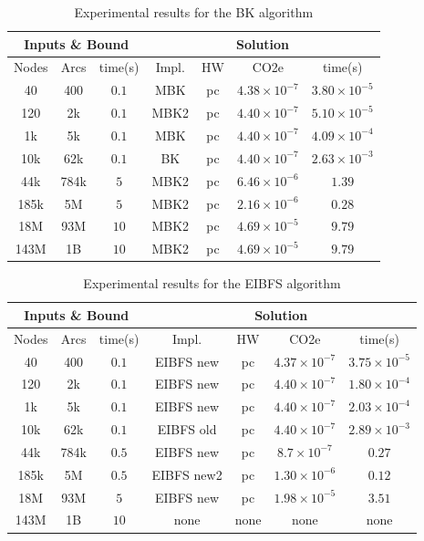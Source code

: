 \documentclass[a4paper,singleside,12pt]{report} %
\begin{document}
\begin{table}[h!]
    \centering
    \begin{tabular}{|ccc|cccc|}
        \hline
        \multicolumn{3}{|c|}{Inputs \& Bound} & \multicolumn{4}{c|}{Solution} \\
        \hline
        Nodes & Arcs & time(s) & Impl. & HW & CO2e & time(s) \\
        \hline
        40 & 400 & $0.1$ & MBK & pc & $4.38 \times 10^{-7}$ & $3.80 \times 10^{-5}$ \\
        120 & 2k & $0.1$ & MBK2 & pc & $4.40 \times 10^{-7}$ & $5.10 \times 10^{-5}$ \\
        1k & 5k & $0.1$ & MBK & pc & $4.40 \times 10^{-7}$ & $4.09 \times 10^{-4}$ \\
        10k & 62k & $0.1$ & BK & pc & $4.40 \times 10^{-7}$ & $2.63 \times 10^{-3}$ \\
        44k & 784k & $5$ & MBK2 & pc & $6.46 \times 10^{-6}$ & $1.39$ \\
        185k & 5M & $5$ & MBK2 & pc & $2.16 \times 10^{-6}$ & $0.28$ \\
        18M & 93M & $10$ & MBK2 & pc & $4.69 \times 10^{-5}$& $9.79$ \\
        143M & 1B & $10$ & MBK2 & pc & $4.69 \times 10^{-5}$ & $9.79$ \\
        \hline
    \end{tabular}
    \caption{Experimental results for the BK algorithm}
    \label{tab:bk_results}
\end{table}

\begin{table}[h!]
    \centering
    \begin{tabular}{|ccc|cccc|}
        \hline
        \multicolumn{3}{|c|}{Inputs \& Bound} & \multicolumn{4}{c|}{Solution} \\
        \hline
        Nodes & Arcs & time(s) & Impl. & HW & CO2e & time(s) \\
        \hline
        40 & 400 & $0.1$ & EIBFS new & pc & $4.37 \times 10^{-7}$ & $3.75 \times 10^{-5}$ \\
        120 & 2k & $0.1$ & EIBFS new & pc & $4.40 \times 10^{-7}$ & $1.80 \times 10^{-4}$ \\
        1k & 5k & $0.1$ & EIBFS new & pc & $4.40 \times 10^{-7}$ & $2.03 \times 10^{-4}$ \\
        10k & 62k & $0.1$ & EIBFS old & pc & $4.40 \times 10^{-7}$ & $2.89 \times 10^{-3}$ \\
        44k & 784k & $0.5$ & EIBFS new & pc & $8.7 \times 10^{-7}$ & $0.27$ \\
        185k & 5M & $0.5$ & EIBFS new2 & pc & $1.30 \times 10^{-6}$ & $0.12$ \\
        18M & 93M & $5$ & EIBFS new & pc & $1.98 \times 10^{-5}$& $3.51$ \\
        143M & 1B & $10$ & none & none & none & none \\
        \hline
    \end{tabular}
    \caption{Experimental results for the EIBFS algorithm}
    \label{tab:eibfs_results}
\end{table}
\end{document}
